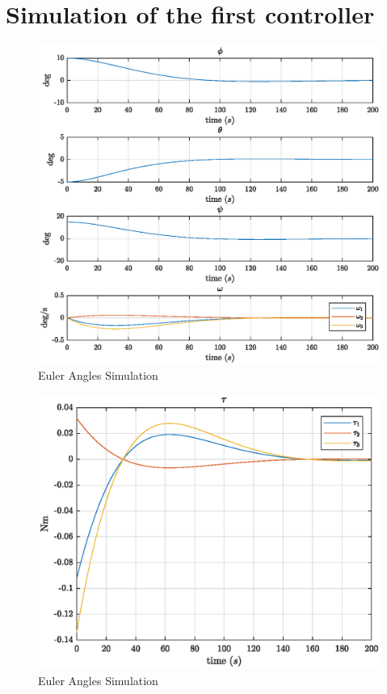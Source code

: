 \section{Simulation of the first controller}

\begin{figure}[h!]
    \centering
    \includegraphics[scale=0.75]{eulang1.eps}
    \caption{Euler Angles Simulation}
    \label{fig:eulang1}
\end{figure}


\begin{figure}[h!]
    \centering
    \includegraphics[scale=0.90]{tau1.eps}
    \caption{Euler Angles Simulation}
    \label{fig:tau1}
\end{figure}